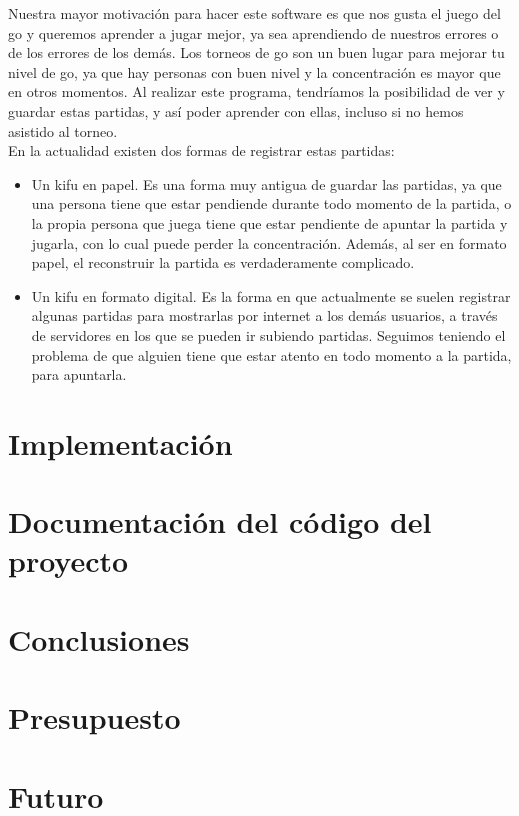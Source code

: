 \documentclass[12pt,a4paper]{report}
\begin{document}
Nuestra mayor motivación para hacer este software es que nos gusta el juego del
go y queremos aprender a jugar mejor, ya sea aprendiendo de nuestros errores o de los
errores de los demás. Los torneos de go son un buen lugar para mejorar tu nivel
de go, ya que hay personas con buen nivel y la concentración es mayor que en
otros momentos. 
Al realizar este programa, tendríamos la posibilidad de ver y
guardar estas partidas, y así poder aprender con ellas, incluso si no hemos
asistido al torneo.
\\
En la actualidad existen dos formas de registrar estas partidas: 
\begin{itemize}
\item Un kifu en papel. Es una forma muy antigua de guardar las partidas, ya que
una persona tiene que estar pendiende durante todo momento de la partida, o la
propia persona que juega tiene que estar pendiente de apuntar la partida y
jugarla, con lo cual puede perder la concentración. Además, al ser en formato
papel, el reconstruir la partida es verdaderamente complicado. 
\item Un kifu en formato digital. Es la forma en que actualmente se suelen
registrar algunas partidas para mostrarlas por internet a los demás usuarios, a
través de servidores en los que se pueden ir subiendo partidas. Seguimos
teniendo el problema de que alguien tiene que estar atento en todo momento a la
partida, para apuntarla. 
\end{itemize}



\chapter{Implementación}


\chapter{Documentación del código del proyecto}


\chapter{Conclusiones}


\chapter{Presupuesto}


\chapter{Futuro}
\end{document}
